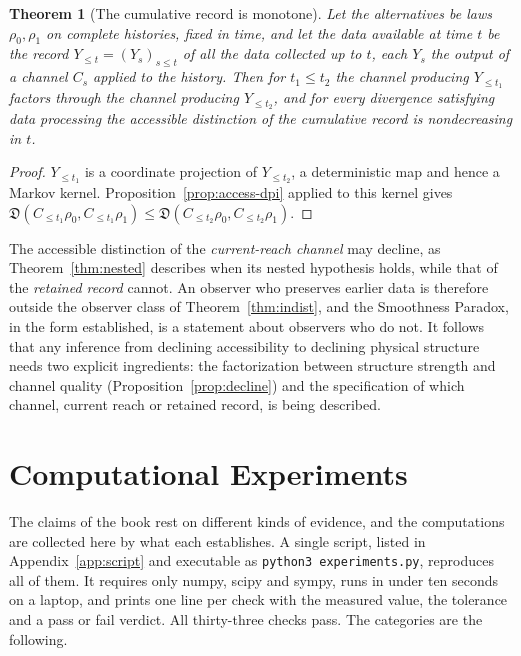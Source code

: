\documentclass[11pt,oneside]{book}
\newtheorem{theorem}{Theorem}[chapter]
\theoremstyle{definition}
\theoremstyle{remark}
\begin{document}
\begin{theorem}[The cumulative record is monotone]\label{thm:cumulative}
Let the alternatives be laws $\rho_0,\rho_1$ on complete histories, fixed in time, and let the data available at time $t$ be the record $Y_{\leq t}=(Y_s)_{s\leq t}$ of all the data collected up to $t$, each $Y_s$ the output of a channel $C_s$ applied to the history. Then for $t_1\leq t_2$ the channel producing $Y_{\leq t_1}$ factors through the channel producing $Y_{\leq t_2}$, and for every divergence satisfying data processing the accessible distinction of the cumulative record is nondecreasing in $t$.
\end{theorem}

\begin{proof}
$Y_{\leq t_1}$ is a coordinate projection of $Y_{\leq t_2}$, a deterministic map and hence a Markov kernel. Proposition~\ref{prop:access-dpi} applied to this kernel gives $\mathfrak D(C_{\leq t_1}\rho_0,C_{\leq t_1}\rho_1)\leq\mathfrak D(C_{\leq t_2}\rho_0,C_{\leq t_2}\rho_1)$.
\end{proof}

The accessible distinction of the \emph{current-reach channel} may decline, as Theorem~\ref{thm:nested} describes when its nested hypothesis holds, while that of the \emph{retained record} cannot. An observer who preserves earlier data is therefore outside the observer class of Theorem~\ref{thm:indist}, and the Smoothness Paradox, in the form established, is a statement about observers who do not. It follows that any inference from declining accessibility to declining physical structure needs two explicit ingredients: the factorization between structure strength and channel quality (Proposition~\ref{prop:decline}) and the specification of which channel, current reach or retained record, is being described.

\chapter{Computational Experiments}\label{ch:experiments}

The claims of the book rest on different kinds of evidence, and the computations are collected here by what each establishes. A single script, listed in Appendix~\ref{app:script} and executable as \texttt{python3 experiments.py}, reproduces all of them. It requires only numpy, scipy and sympy, runs in under ten seconds on a laptop, and prints one line per check with the measured value, the tolerance and a pass or fail verdict. All thirty-three checks pass. The categories are the following.
\end{document}
